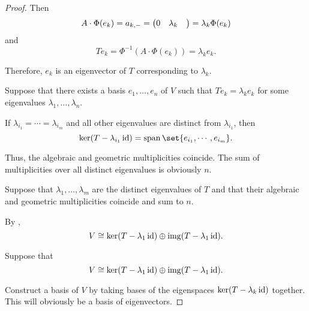 \begin{proof}
  Then
  \begin{equation*}
    A \cdot \Phi(e_k) = a_{k,\anon*} = \begin{pmatrix} 0 & \lambda_k & \end{pmatrix} = \lambda_k \Phi(e_k)
  \end{equation*}
  and
  \begin{equation*}
    T e_k = \Phi^{-1}(A \cdot \Phi(e_k)) = \lambda_k e_k.
  \end{equation*}

  Therefore, \( e_k \) is an eigenvector of \( T \) corresponding to \( \lambda_k \).

   Suppose that there exists a basis \( e_1, \ldots, e_n \) of \( V \) such that \( Te_k = \lambda_k e_k \) for some eigenvalues \( \lambda_1, \ldots, \lambda_n \).

  If \( \lambda_{i_1} = \cdots = \lambda_{i_m} \) and all other eigenvalues are distinct from \( \lambda_{i_1} \), then
  \begin{equation*}
    \ker(T - \lambda_{i_1} \id) = \linspan\set{ e_{i_1}, \cdots, e_{i_m} }.
  \end{equation*}

  Thus, the algebraic and geometric multiplicities coincide. The sum of multiplicities over all distinct eigenvalues is obviously \( n \).

   Suppose that \( \lambda_1, \ldots, \lambda_m \) are the distinct eigenvalues of \( T \) and that their algebraic and geometric multiplicities coincide and sum to \( n \).

  By ,
  \begin{equation*}
    V \cong \ker(T - \lambda_1 \operatorname{id}) \oplus \operatorname{img}(T - \lambda_1 \operatorname{id}).
  \end{equation*}

   Suppose that
  \begin{equation*}
    V \cong \ker(T - \lambda_1 \operatorname{id}) \oplus \operatorname{img}(T - \lambda_1 \operatorname{id}).
  \end{equation*}

  Construct a basis of \( V \) by taking bases of the eigenspaces \( \ker(T - \lambda_k \operatorname{id}) \) together. This will obviously be a basis of eigenvectors.
\end{proof}

